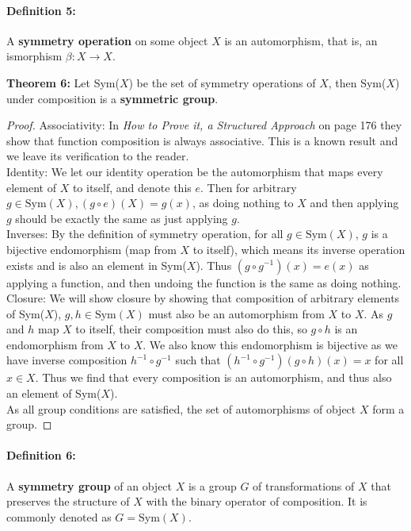 \documentclass[twoside]{article}
\newcommand{\done}{\renewcommand\qedsymbol{$\blacksquare$}}
\begin{document}
\begin{spacing}{1.25}
\paragraph*{Definition 5:} A \textbf{symmetry operation} on some object $X$ is an automorphism, that is, an ismorphism  $\beta: X \rightarrow X$.
\begin{mdframed}[roundcorner=10pt, backgroundcolor=gray!10]
  \textbf{Theorem 6:} Let Sym($X$) be the set of symmetry operations of $X$, then Sym($X$) under composition is a 
  \textbf{symmetric group}.
\end{mdframed}
\begin{proof}
Associativity: In \textit{How to Prove it, a Structured Approach} on page 176 they show that function composition
is always associative. This is a known result and we leave its verification to the reader.\\
Identity: We let our identity operation be the automorphism that maps every element of $X$ to itself, and denote this
$e$. Then for arbitrary $g \in \text{Sym}(X), (g \circ e)(X) = g(x)$, as doing nothing to $X$ and then applying $g$
should be exactly the same as just applying $g$.  \\
Inverses: By the definition of symmetry operation, for all $g \in \text{Sym}(X)$, $g$ is a bijective endomorphism (map from $X$ to itself), which means its inverse operation exists and is also an element in Sym($X$). Thus
$(g \circ g^{-1})(x) = e(x)$ as applying a function, and then undoing the function is the same as doing nothing.\\
Closure: We will show closure by showing that composition of arbitrary elements of Sym($X$), $g, h \in \text{Sym}(X)$
must also be an automorphism from $X$ to $X$. As $g$ and $h$ map $X$ to itself, their composition must also do this, so 
$g \circ h$ is an endomorphism from $X$ to $X$. We also know this endomorphism is bijective as we have inverse composition $h^{-1} \circ g^{-1}$ such that $ (h^{-1} \circ g^{-1})(g \circ h)(x) = x$ for all $x \in X$. Thus we find
that every composition is an automorphism, and thus also an element of Sym($X$). \\
As all group conditions are satisfied, the set of automorphisms of object $X$ form a group.
\done 
\end{proof}

\paragraph*{Definition 6:} A \textbf{symmetry group} of an object $X$ is a
group $G$ of transformations of $X$ that preserves the structure of $X$ with 
the binary operator of composition. It is commonly denoted as $G=\text{Sym}(X)$.


\end{spacing}
\end{document}

